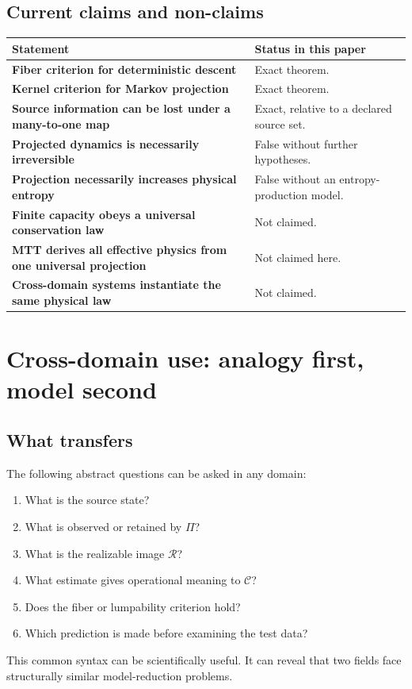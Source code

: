 \documentclass[11pt]{article}
\newcommand{\Rset}{\mathcal R}
\newcommand{\Ccap}{\mathcal C}
\begin{document}
\subsection{Current claims and non-claims}

\begin{center}
\begingroup
\renewcommand{\arraystretch}{1.12}
\begin{tabularx}{\textwidth}{>{\raggedright\arraybackslash\bfseries}p{}>{\raggedright\arraybackslash}X}
\toprule
Statement & Status in this paper \\
\midrule
Fiber criterion for deterministic descent & Exact theorem. \\
Kernel criterion for Markov projection & Exact theorem. \\
Source information can be lost under a many-to-one map & Exact, relative
to a declared source set. \\
Projected dynamics is necessarily irreversible & False without further
hypotheses. \\
Projection necessarily increases physical entropy & False without an
entropy-production model. \\
Finite capacity obeys a universal conservation law & Not claimed. \\
MTT derives all effective physics from one universal projection & Not
claimed here. \\
Cross-domain systems instantiate the same physical law & Not claimed. \\
\bottomrule
\end{tabularx}
\endgroup
\end{center}

\section{Cross-domain use: analogy first, model second}

\subsection{What transfers}

The following abstract questions can be asked in any domain:
\begin{enumerate}
\item What is the source state?
\item What is observed or retained by $\Pi$?
\item What is the realizable image $\Rset$?
\item What estimate gives operational meaning to $\Ccap$?
\item Does the fiber or lumpability criterion hold?
\item Which prediction is made before examining the test data?
\end{enumerate}
This common syntax can be scientifically useful.  It can reveal that two
fields face structurally similar model-reduction problems.
\end{document}
